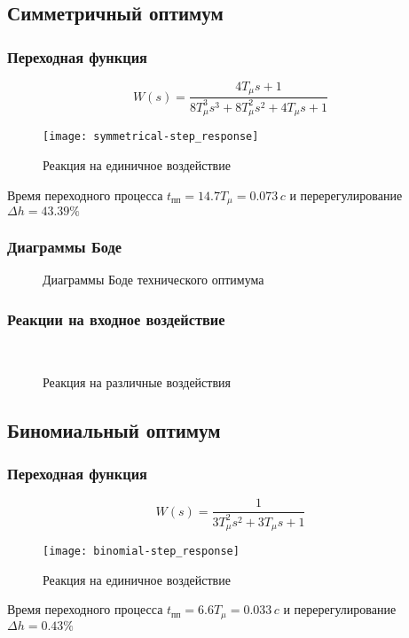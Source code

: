 		\subsection{Симметричный оптимум}
			\subsubsection{Переходная функция}
				$$W(s)=\frac{4T_\mu s+1}{8T_\mu^3 s^3+8T_\mu^2 s^2+4T_\mu s+1}$$
				\begin{figure}[H]
					\centering
					\texttt{[image: symmetrical-step\_response]}
					\caption{Реакция на единичное воздействие}
				\end{figure}
				Время переходного процесса $t_{\text{пп}}=14.7T_{\mu}=0.073\,c$ и перерегулирование $\Delta h=43.39\%$
			\subsubsection{Диаграммы Боде}
				\begin{figure}[H]
					\centering
					\caption{Диаграммы Боде технического оптимума}
				\end{figure}
			\subsubsection{Реакции на входное воздействие}
				\begin{figure}[H]
					\centering
					\\
					\centering{}
					\caption{Реакция на различные воздействия}
				\end{figure}
		\newpage
		\subsection{Биномиальный оптимум}
			\subsubsection{Переходная функция}
				$$W(s)=\frac{1}{3T_\mu^2 s^2+3T_\mu s+1}$$
				\begin{figure}[H]
					\centering
					\texttt{[image: binomial-step\_response]}
					\caption{Реакция на единичное воздействие}
				\end{figure}
				Время переходного процесса $t_{\text{пп}}=6.6T_{\mu}=0.033\,c$ и перерегулирование $\Delta h=0.43\%$
